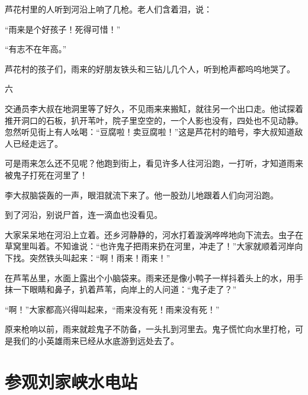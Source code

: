 \documentclass[12pt,UTF-8,openany]{ctexbook}
\begin{document}
\begin{large}
    芦花村里的人听到河沿上响了几枪。老人们含着泪，说：
    
    “雨来是个好孩子！死得可惜！”
    
    “有志不在年高。”
    
    芦花村的孩子们，雨来的好朋友铁头和三钻儿几个人，听到枪声都呜呜地哭了。
    
    六
    
    交通员李大叔在地洞里等了好久，不见雨来来搬缸，就往另一个出口走。他试探着推开洞口的石板，扒开苇叶，院子里空空的，一个人影也没有，四处也不见动静。忽然听见街上有人吆喝：“豆腐啦！卖豆腐啦！”这是芦花村的暗号，李大叔知道敌人已经走远了。
    
    可是雨来怎么还不见呢？他跑到街上，看见许多人往河沿跑，一打听，才知道雨来被鬼子打死在河里了！
    
    李大叔脑袋轰的一声，眼泪就流下来了。他一股劲儿地跟着人们向河沿跑。
    
    到了河沿，别说尸首，连一滴血也没看见。
    
    大家呆呆地在河沿上立着。还乡河静静的，河水打着漩涡哗哗地向下流去。虫子在草窝里叫着。不知谁说：“也许鬼子把雨来扔在河里，冲走了！”大家就顺着河岸向下找。突然铁头叫起来：“啊！雨来！雨来！”
    
    在芦苇丛里，水面上露出个小脑袋来。雨来还是像小鸭子一样抖着头上的水，用手抹一下眼睛和鼻子，扒着芦苇，向岸上的人问道：“鬼子走了？”
    
    “啊！”大家都高兴得叫起来，“雨来没有死！雨来没有死！”
    
    原来枪响以前，雨来就趁鬼子不防备，一头扎到河里去。鬼子慌忙向水里打枪，可是我们的小英雄雨来已经从水底游到远处去了。
    
\end{large}



\chapter{参观刘家峡水电站}
\end{document}
